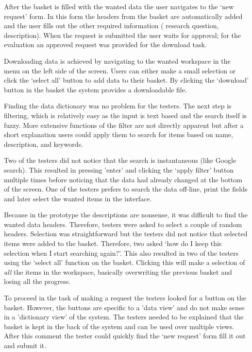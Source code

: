 After the basket is filled with the wanted data the user navigates to the `new request' form.
In this form the headers from the basket are automatically added and the user fills out the other required information (\eg{} research question, description).
When the request is submitted the user waits for approval; for the evaluation an approved request was provided for the download task.

Downloading data is achieved by navigating to the wanted workspace in the menu on the left side of the screen.
Users can either make a small selection or click the `select all' button to add data to their basket.
By clicking the `download' button in the basket the system provides a downloadable file.

Finding the data dictionary was no problem for the testers.
The next step is filtering, which is relatively easy as the input is text based and the search itself is fuzzy.
More extensive functions of the filter are not directly apparent but after a short explanation users could apply them to search for items based on name, description, and keywords.

Two of the testers did not notice that the search is instantaneous (like Google search).
This resulted in pressing 'enter' and clicking the `apply filter' button multiple times before noticing that the data had already changed at the bottom of the screen.
One of the testers prefers to search the data off-line, \ie{} print the fields and later select the wanted items in the interface.

Because in the prototype the descriptions are nonsense, it was difficult to find the wanted data headers.
Therefore, testers were asked to select a couple of random headers.
Selection was straightforward but the testers did not notice that selected items were added to the basket.
Therefore, two asked `how do I keep this selection when I start searching again?'.
This also resulted in two of the testers using the `select all' function on the basket.
Clicking this will make a selection of \emph{all} the items in the workspace, basically overwriting the previous basket and losing all the progress.

To proceed in the task of making a request the testers looked for a button on the basket.
However, the buttons are specific to a 'data view' and do not make sense in a 'dictionary view' of the system.
The testers needed to be explained that the basket is kept in the back of the system and can be used over multiple views.
After this comment the tester could quickly find the `new request' form fill it out and submit it.

